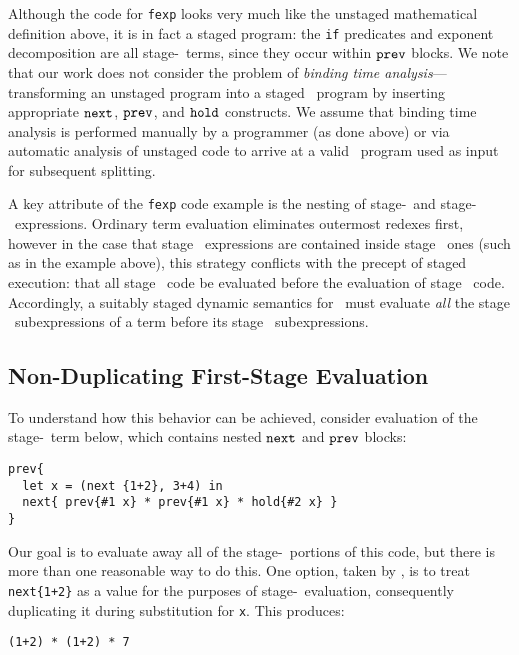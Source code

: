 Although the code for {\tt fexp} looks very much like the unstaged mathematical
definition above, it is in fact a staged program: the {\tt if} predicates and exponent
decomposition are all stage-\bbone\ terms, since they occur within ${\tt prev}$ blocks.
We note that our work does not consider the problem of {\em binding time analysis}---transforming an unstaged program into a staged \lang\ program by inserting appropriate ${\tt next}$, ${\tt prev}$, and ${\tt hold}$ constructs. We assume that binding time analysis is performed manually by a programmer (as done above) or via automatic analysis of unstaged code to arrive at a valid \lang\ program used as input for subsequent splitting.

A key attribute of the {\tt fexp} code example is the nesting of stage-\bbone\ and stage-\bbtwo\ expressions. Ordinary term evaluation eliminates outermost redexes first, 
however in the case that stage \bbone\ expressions are contained inside
stage \bbtwo\ ones (such as in the example above), this strategy conflicts with the precept of staged execution: that all stage \bbone\ code be evaluated before the evaluation of stage \bbtwo\ code. 
Accordingly, a suitably staged dynamic semantics for \lang\ must evaluate
\emph{all} the stage \bbone\ subexpressions of a term before its stage
\bbtwo\ subexpressions.

\subsection{Non-Duplicating First-Stage Evaluation}

To understand how this behavior can be achieved, consider evaluation of the stage-\bbtwo\ term below, which contains nested ${\tt next}$ and ${\tt prev}$ blocks:
\begin{lstlisting} 
prev{
  let x = (next {1+2}, 3+4) in
  next{ prev{#1 x} * prev{#1 x} * hold{#2 x} }
}
\end{lstlisting}
Our goal is to evaluate away all of the stage-\bbone\ portions of this code, but there is more than one reasonable way to do this.
One option, taken by \cite{davies96}, is to treat \verb|next{1+2}| as a value for the purposes of stage-\bbone~evaluation, 
consequently duplicating it during substitution for {\tt x}.  
This produces:
\begin{lstlisting}
(1+2) * (1+2) * 7
\end{lstlisting}


